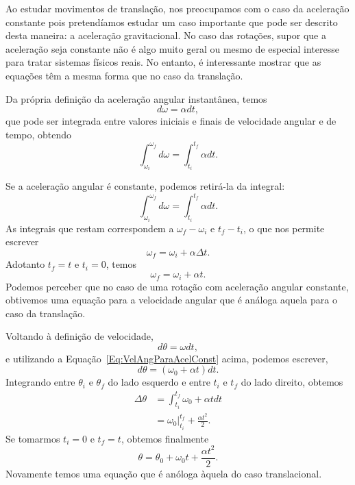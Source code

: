 Ao estudar movimentos de translação, nos preocupamos com o caso da aceleração constante pois pretendíamos estudar um caso importante que pode ser descrito desta maneira: a aceleração gravitacional. No caso das rotações, supor que a aceleração seja constante não é algo muito geral ou mesmo de especial interesse para tratar sistemas físicos reais. No entanto, é interessante mostrar que as equações têm a mesma forma que no caso da translação.

Da própria definição da aceleração angular instantânea, temos
\begin{equation}
	d\omega = \alpha dt,
\end{equation}
%
que pode ser integrada entre valores iniciais e finais de velocidade angular e de tempo, obtendo
\begin{equation}
	\int_{\omega_i}^{\omega_f} d\omega = \int_{t_i}^{t_f} \alpha dt.
\end{equation}

Se a aceleração angular é constante, podemos retirá-la da integral:
\begin{equation}
		\int_{\omega_i}^{\omega_f} d\omega = \int_{t_i}^{t_f} \alpha dt.
\end{equation}
%
As integrais que restam correspondem a $\omega_f - \omega_i$ e $t_f - t_i$, o que nos permite escrever
\begin{equation}
	\omega_f = \omega_i + \alpha\Delta t.
\end{equation}
%
Adotanto $t_f = t$ e $t_i = 0$, temos 
\begin{equation}\label{Eq:VelAngParaAcelConst}
	\omega_f = \omega_i + \alpha t.
\end{equation}
%
Podemos perceber que no caso de uma rotação com aceleração angular constante, obtivemos uma equação para a velocidade angular que é análoga aquela para o caso da translação.

Voltando à definição de velocidade, 
\begin{equation}
	d\theta = \omega dt,
\end{equation}
%
e utilizando a Equação~\ref{Eq:VelAngParaAcelConst} acima, podemos escrever,
\begin{equation}
	d\theta = (\omega_0 + \alpha t) dt.
\end{equation}
%
Integrando entre $\theta_i$ e $\theta_f$ do lado esquerdo e entre $t_i$ e $t_f$ do lado direito, obtemos
\begin{align}
	\Delta \theta &= \int_{t_i}^{t_f} \omega_0 + \alpha t dt \\
	&= \omega_0 |_{t_i}^{t_f} + \frac{\alpha t^2}{2}.
\end{align}
%
Se tomarmos $t_i = 0$ e $t_f = t$, obtemos finalmente
\begin{equation}
	\theta = \theta_0 + \omega_0 t +\frac{\alpha t^2}{2}.
\end{equation}
%
Novamente temos uma equação que é anóloga àquela do caso translacional.
	
